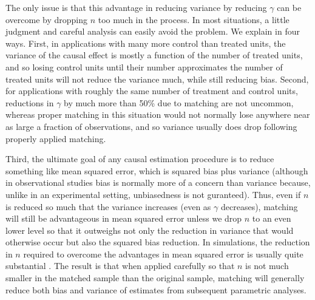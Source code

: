\documentclass[11pt,titlepage]{article}
\begin{document}
The only issue is that this advantage in reducing variance by reducing
$\gamma$ can be overcome by dropping $n$ too much in the process.  In
most situations, a little judgment and careful analysis can easily
avoid the problem.  We explain in four ways.  First, in applications
with many more control than treated units, the variance of the causal
effect is mostly a function of the number of treated units, and so
losing control units until their number approximates the number of
treated units will not reduce the variance much, while still reducing
bias.  Second, for applications with roughly the same number of
treatment and control units, reductions in $\gamma$ by much more than
50\% due to matching are not uncommon, whereas proper matching in this
situation would not normally lose anywhere near as large a fraction of
observations, and so variance usually does drop following properly
applied matching.

Third, the ultimate goal of any causal estimation procedure is to
reduce something like mean squared error, which is squared bias plus
variance (although in observational studies bias is normally more of a
concern than variance because, unlike in an experimental setting,
unbiasedness is not guranteed).  Thus, even if $n$ is reduced so much
that the variance increases (even as $\gamma$ decreases), matching
will still be advantageous in mean squared error unless we drop $n$ to
an even lower level so that it outweighs not only the reduction in
variance that would otherwise occur but also the squared bias
reduction.  In simulations, the reduction in $n$ required to overcome
the advantages in mean squared error is usually quite substantial
\citep{RubTho96,ImaDyk04}.  The result is that when applied carefully
so that $n$ is not much smaller in the matched sample than the
original sample, matching will generally reduce both bias and variance
of estimates from subsequent parametric analyses.
\end{document}
